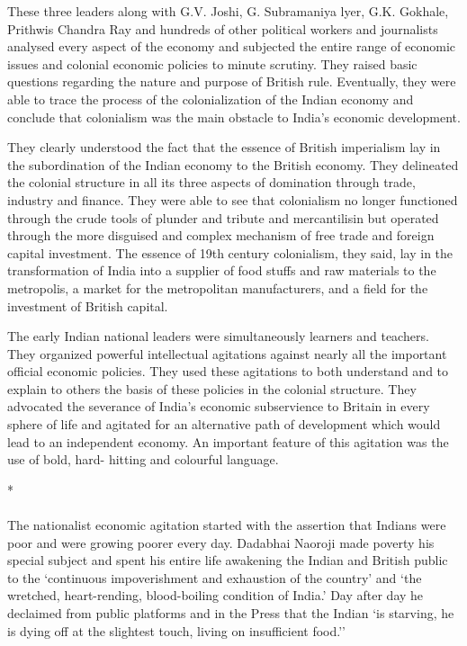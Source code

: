 These three leaders along with G.V. Joshi, G. Subramaniya lyer, G.K. Gokhale, Prithwis Chandra Ray and hundreds of other political workers and journalists analysed every aspect of the economy and subjected the entire range of economic issues and colonial economic policies to minute scrutiny. They raised basic questions regarding the nature and purpose of British rule. Eventually, they were able to trace the process of the colonialization of the Indian economy and conclude that colonialism was the main obstacle to India's economic development.

They clearly understood the fact that the essence of British imperialism lay in the subordination of the Indian economy to the British economy. They delineated the colonial structure in all its three aspects of domination through trade, industry and finance. They were able to see that colonialism no longer functioned through the crude tools of plunder and tribute and mercantilisin but operated through the more disguised and complex mechanism of free trade and foreign capital investment. The essence of 19th century colonialism, they said, lay in the transformation of India into a supplier of food stuffs and raw materials to the metropolis, a market for the metropolitan manufacturers, and a field for the investment of British capital.

The early Indian national leaders were simultaneously learners and teachers. They organized powerful intellectual agitations against nearly all the important official economic policies. They used these agitations to both understand and to explain to others the basis of these policies in the colonial structure. They advocated the severance of India's economic subservience to Britain in every sphere of life and agitated for an alternative path of development which would lead to an independent economy. An important feature of this agitation was the use of bold, hard- hitting and colourful language.

\begin{center}*\end{center}

\paragraph*{}


The nationalist economic agitation started with the assertion that Indians were poor and were growing poorer every day. Dadabhai Naoroji made poverty his special subject and spent his entire life awakening the Indian and British public to the `continuous impoverishment and exhaustion of the country' and `the wretched, heart-rending, blood-boiling condition of India.' Day after day he declaimed from public platforms and in the Press that the Indian `is starving, he is dying off at the slightest touch, living on insufficient food.''

